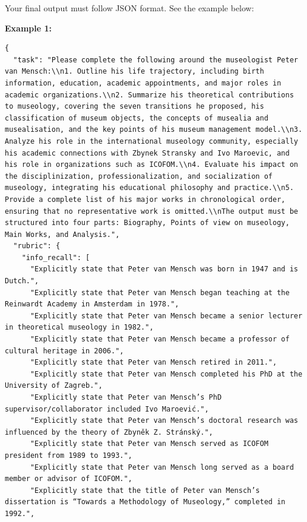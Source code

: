\documentclass[11pt]{article}
\begin{document}
\begin{tcolorbox}[
  breakable,
  colback=porcelain,
  colframe=gray!75!black,
  left=6pt, right=6pt, top=6pt, bottom=6pt,
  fontupper=\small
]
Your final output must follow JSON format. See the example below:

\textbf{Example 1:}

\begin{lstlisting}[basicstyle=\ttfamily\footnotesize, breaklines=true, frame=none, numbers=none]
{
  "task": "Please complete the following around the museologist Peter van Mensch:\\n1. Outline his life trajectory, including birth information, education, academic appointments, and major roles in academic organizations.\\n2. Summarize his theoretical contributions to museology, covering the seven transitions he proposed, his classification of museum objects, the concepts of musealia and musealisation, and the key points of his museum management model.\\n3. Analyze his role in the international museology community, especially his academic connections with Zbynek Stransky and Ivo Maroevic, and his role in organizations such as ICOFOM.\\n4. Evaluate his impact on the disciplinization, professionalization, and socialization of museology, integrating his educational philosophy and practice.\\n5. Provide a complete list of his major works in chronological order, ensuring that no representative work is omitted.\\nThe output must be structured into four parts: Biography, Points of view on museology, Main Works, and Analysis.",
  "rubric": {
    "info_recall": [
      "Explicitly state that Peter van Mensch was born in 1947 and is Dutch.",
      "Explicitly state that Peter van Mensch began teaching at the Reinwardt Academy in Amsterdam in 1978.",
      "Explicitly state that Peter van Mensch became a senior lecturer in theoretical museology in 1982.",
      "Explicitly state that Peter van Mensch became a professor of cultural heritage in 2006.",
      "Explicitly state that Peter van Mensch retired in 2011.",
      "Explicitly state that Peter van Mensch completed his PhD at the University of Zagreb.",
      "Explicitly state that Peter van Mensch’s PhD supervisor/collaborator included Ivo Maroević.",
      "Explicitly state that Peter van Mensch’s doctoral research was influenced by the theory of Zbyněk Z. Stránský.",
      "Explicitly state that Peter van Mensch served as ICOFOM president from 1989 to 1993.",
      "Explicitly state that Peter van Mensch long served as a board member or advisor of ICOFOM.",
      "Explicitly state that the title of Peter van Mensch’s dissertation is “Towards a Methodology of Museology,” completed in 1992.",

\end{lstlisting}
\end{tcolorbox}
\end{document}
